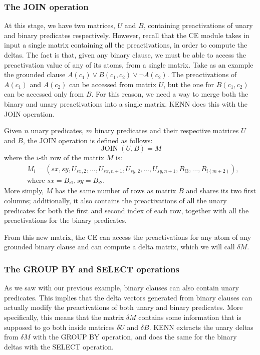 \subsubsection{The JOIN operation}
At this stage, we have two matrices, $U$ and $B$, containing preactivations of unary and binary predicates respectively. However, recall that the CE module takes in input a single matrix containing all the preactivations, in order to compute the deltas. The fact is that, given any binary clause, we must be able to access the preactivation value of any of its atoms, from a single matrix. Take as an example the grounded clause $A(c_1) \vee B(c_1,c_2) \vee \neg A(c_2)$. The preactivations of $A(c_1)$ and $ A(c_2)$ can be accessed from matrix $U$, but the one for $B(c_1, c_2)$ can be accessed only from $B$.
For this reason, we need a way to merge both the binary and unary preactivations into a single matrix. KENN does this with the JOIN operation. 
\begin{definition}[JOIN]
	Given $n$ unary predicates, $m$ binary predicates and their respective matrices $U$ and $B$, the JOIN operation is defined as follows:
	\begin{equation}
	\operatorname{JOIN}(U,B) = M
	\end{equation}
	where the $i$-th row of the matrix $M$ is:
	\begin{equation}
	\begin{align*}
	&M_{i} = (sx,sy, U_{sx,2}, \dots, U_{sx,n+1}, U_{sy,2}, \dots, U_{sy,n+1},B_{i3},\dots, B_{i(m+2)}),\\
	&\text{where   } sx = B_{i1}, sy = B_{i2}.
	\end{align*}
	\end{equation}
More simply, $M$ has the same number of rows as matrix $B$ and shares its two first columns; additionally, it also contains the preactivations of all the unary predicates for both the first and second index of each row, together with all the preactivations for the binary predicates. 
\end{definition}

From this new matrix, the CE can access the preactivations for any atom of any grounded binary clause and can compute a delta matrix, which we will call $\delta M$.


\subsubsection{The GROUP BY and SELECT operations}
As we saw with our previous example, binary clauses can also contain unary predicates. This implies that the delta vectors generated from binary clauses can actually modify the preactivations of both unary and binary predicates. More specifically, this means that the matrix $\delta M$ contains some information that is supposed to go both inside matrices $\delta U$ and $\delta B$. KENN extracts the unary deltas from $\delta M$ with the GROUP BY operation, and does the same for the binary deltas with the SELECT operation.

